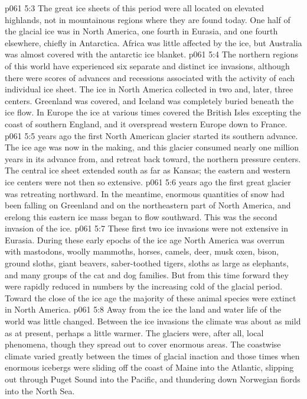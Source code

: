 \vs p061 5:3 The great ice sheets of this period were all located on elevated highlands, not in mountainous regions where they are found today. One half of the glacial ice was in North America, one fourth in Eurasia, and one fourth elsewhere, chiefly in Antarctica. Africa was little affected by the ice, but Australia was almost covered with the antarctic ice blanket.
\vs p061 5:4 The northern regions of this world have experienced six separate and distinct ice invasions, although there were scores of advances and recessions associated with the activity of each individual ice sheet. The ice in North America collected in two and, later, three centers. Greenland was covered, and Iceland was completely buried beneath the ice flow. In Europe the ice at various times covered the British Isles excepting the coast of southern England, and it overspread western Europe down to France.
\vs p061 5:5 \pc {} years ago the first North American glacier started its southern advance. The ice age was now in the making, and this glacier consumed nearly one million years in its advance from, and retreat back toward, the northern pressure centers. The central ice sheet extended south as far as Kansas; the eastern and western ice centers were not then so extensive.
\vs p061 5:6 \pc {} years ago the first great glacier was retreating northward. In the meantime, enormous quantities of snow had been falling on Greenland and on the northeastern part of North America, and erelong this eastern ice mass began to flow southward. This was the second invasion of the ice.
\vs p061 5:7 These first two ice invasions were not extensive in Eurasia. During these early epochs of the ice age North America was overrun with mastodons, woolly mammoths, horses, camels, deer, musk oxen, bison, ground sloths, giant beavers, saber\hyp{}toothed tigers, sloths as large as elephants, and many groups of the cat and dog families. But from this time forward they were rapidly reduced in numbers by the increasing cold of the glacial period. Toward the close of the ice age the majority of these animal species were extinct in North America.
\vs p061 5:8 Away from the ice the land and water life of the world was little changed. Between the ice invasions the climate was about as mild as at present, perhaps a little warmer. The glaciers were, after all, local phenomena, though they spread out to cover enormous areas. The coastwise climate varied greatly between the times of glacial inaction and those times when enormous icebergs were sliding off the coast of Maine into the Atlantic, slipping out through Puget Sound into the Pacific, and thundering down Norwegian fiords into the North Sea.
